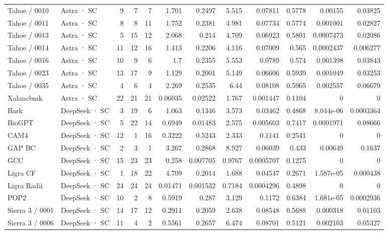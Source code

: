 \begin{tabular}{llrrrrrrrrrr}
Tahoe / 0010 & Astra · SC & 9 & 7 & 7 & 1.701 & 0.2497 & 5.515 & 0.07811 & 0.5778 & 0.00155 & 0.03825 \\
Tahoe / 0011 & Astra · SC & 8 & 8 & 11 & 1.752 & 0.2381 & 4.981 & 0.07734 & 0.5774 & 0.001001 & 0.02827 \\
Tahoe / 0013 & Astra · SC & 5 & 15 & 12 & 2.068 & 0.214 & 4.709 & 0.06923 & 0.5801 & 0.0007473 & 0.02086 \\
Tahoe / 0014 & Astra · SC & 11 & 12 & 16 & 1.413 & 0.2206 & 4.116 & 0.07009 & 0.565 & 0.0002437 & 0.006277 \\
Tahoe / 0016 & Astra · SC & 10 & 9 & 6 & 1.7 & 0.2355 & 5.553 & 0.0789 & 0.574 & 0.001398 & 0.03843 \\
Tahoe / 0023 & Astra · SC & 13 & 17 & 9 & 1.129 & 0.2001 & 5.149 & 0.06606 & 0.5939 & 0.001049 & 0.03253 \\
Tahoe / 0035 & Astra · SC & 4 & 6 & 4 & 2.269 & 0.2535 & 6.44 & 0.08108 & 0.5965 & 0.002557 & 0.06679 \\
Xalancbmk & Astra · SC & 22 & 21 & 21 & 0.06035 & 0.02522 & 1.767 & 0.001447 & 0.1104 & 0 & 0 \\
Bark & DeepSeek · SC & 3 & 19 & 6 & 1.063 & 0.1346 & 3.573 & 0.03462 & 0.4868 & 8.044e-06 & 0.0003364 \\
BioGPT & DeepSeek · SC & 5 & 22 & 14 & 0.6949 & 0.01483 & 2.575 & 0.005603 & 0.7417 & 0.0001971 & 0.08666 \\
CAM4 & DeepSeek · SC & 12 & 1 & 16 & 0.3222 & 0.5243 & 2.333 & 0.1141 & 0.2541 & 0 & 0 \\
GAP BC & DeepSeek · SC & 2 & 3 & 1 & 3.267 & 0.2868 & 8.927 & 0.06039 & 0.433 & 0.00649 & 0.1637 \\
GCC & DeepSeek · SC & 15 & 23 & 23 & 0.258 & 0.007705 & 0.9767 & 0.0005707 & 0.1275 & 0 & 0 \\
Ligra CF & DeepSeek · SC & 1 & 18 & 22 & 4.709 & 0.2014 & 1.688 & 0.04547 & 0.2671 & 1.587e-05 & 0.000438 \\
Ligra Radii & DeepSeek · SC & 24 & 24 & 24 & 0.01471 & 0.001532 & 0.7184 & 0.0004296 & 0.4898 & 0 & 0 \\
POP2 & DeepSeek · SC & 10 & 2 & 8 & 0.5919 & 0.287 & 3.129 & 0.1172 & 0.6384 & 1.681e-05 & 0.0002936 \\
Sierra 3 / 0001 & DeepSeek · SC & 14 & 17 & 12 & 0.2911 & 0.2059 & 2.638 & 0.08548 & 0.5688 & 0.000318 & 0.01103 \\
Sierra 3 / 0006 & DeepSeek · SC & 11 & 4 & 2 & 0.5561 & 0.2657 & 6.474 & 0.08701 & 0.5121 & 0.002103 & 0.05327 \\

\end{tabular}

